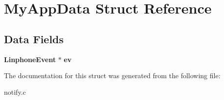 \section{My\+App\+Data Struct Reference}
\label{structMyAppData}
\subsection*{Data Fields}
\begin{DoxyCompactItemize}
\item 
\mbox{\label{structMyAppData_aff9bc592b5ab219061cb741c16d5f15e}} 
\textbf{ Linphone\+Event} $\ast$ {\bfseries ev}
\end{DoxyCompactItemize}


The documentation for this struct was generated from the following file\+:\begin{DoxyCompactItemize}
\item 
notify.\+c\end{DoxyCompactItemize}
